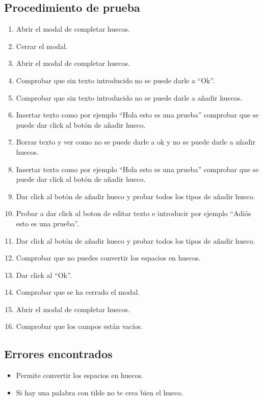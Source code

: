 \subsection{Procedimiento de prueba}
\label{procedimientoPruebas:huecos}
\begin{enumerate}
    \item Abrir el modal de completar huecos.
    \item Cerrar el modal.
    \item Abrir el modal de completar huecos.
    \item Comprobar que sin texto introducido no se puede darle a ``Ok''.
    \item Comprobar que sin texto introducido no se puede darle a añadir huecos.
    \item Insertar texto como por ejemplo ``Hola esto es una prueba'' comprobar que se puede dar click al botón de añadir hueco.
    \item Borrar texto y ver como no se puede darle a ok y no se puede darle a añadir huecos.
    \item Insertar texto como por ejemplo ``Hola esto es una prueba'' comprobar que se puede dar click al botón de añadir hueco.
    \item Dar click al botón de añadir hueco y probar todos los tipos de añadir hueco.
    \item Probar a dar click al boton de editar texto e introducir por ejemplo ``Adiós esto es una prueba''.
    \item Dar click al botón de añadir hueco y probar todos los tipos de añadir hueco.
    \item Comprobar que no puedes convertir los espacios en huecos.
    \item Dar click al ``Ok''.
    \item Comprobar que se ha cerrado el modal.
    \item Abrir el modal de completar huecos.
    \item Comprobar que los campos están vacíos.
\end{enumerate}

\subsection{Errores encontrados}
\label{errores:huecos}
\begin{itemize}
    \item Permite convertir los espacios en huecos.
    \item Si hay una palabra con tilde no te crea bien el hueco.
\end{itemize}

